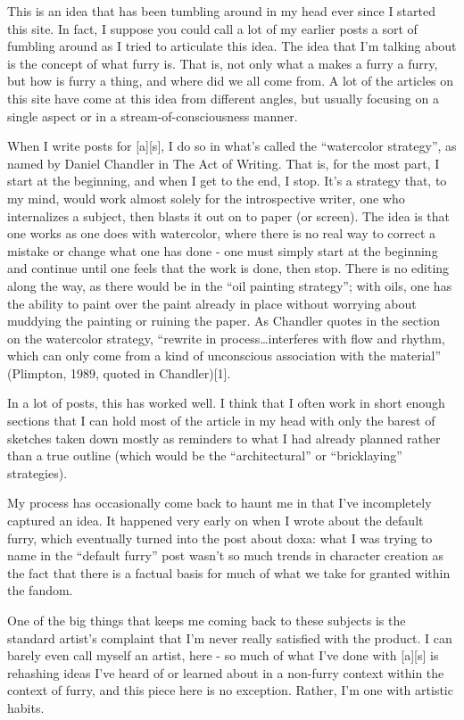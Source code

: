 This is an idea that has been tumbling around in my head ever since I started this site. In fact, I suppose you could call a lot of my earlier posts a sort of fumbling around as I tried to articulate this idea. The idea that I'm talking about is the concept of what furry is. That is, not only what a makes a furry a furry, but how is furry a thing, and where did we all come from. A lot of the articles on this site have come at this idea from different angles, but usually focusing on a single aspect or in a stream-of-consciousness manner.

When I write posts for {[}a{]}{[}s{]}, I do so in what's called the ``watercolor strategy'', as named by Daniel Chandler in The Act of Writing. That is, for the most part, I start at the beginning, and when I get to the end, I stop. It's a strategy that, to my mind, would work almost solely for the introspective writer, one who internalizes a subject, then blasts it out on to paper (or screen). The idea is that one works as one does with watercolor, where there is no real way to correct a mistake or change what one has done - one must simply start at the beginning and continue until one feels that the work is done, then stop. There is no editing along the way, as there would be in the ``oil painting strategy''; with oils, one has the ability to paint over the paint already in place without worrying about muddying the painting or ruining the paper. As Chandler quotes in the section on the watercolor strategy, ``rewrite in process\ldots{}interferes with flow and rhythm, which can only come from a kind of unconscious association with the material'' (Plimpton, 1989, quoted in Chandler){[}1{]}.

In a lot of posts, this has worked well. I think that I often work in short enough sections that I can hold most of the article in my head with only the barest of sketches taken down mostly as reminders to what I had already planned rather than a true outline (which would be the ``architectural'' or ``bricklaying'' strategies).

My process has occasionally come back to haunt me in that I've incompletely captured an idea. It happened very early on when I wrote about the default furry, which eventually turned into the post about doxa: what I was trying to name in the ``default furry'' post wasn't so much trends in character creation as the fact that there is a factual basis for much of what we take for granted within the fandom.

One of the big things that keeps me coming back to these subjects is the standard artist's complaint that I'm never really satisfied with the product. I can barely even call myself an artist, here - so much of what I've done with {[}a{]}{[}s{]} is rehashing ideas I've heard of or learned about in a non-furry context within the context of furry, and this piece here is no exception. Rather, I'm one with artistic habits.

